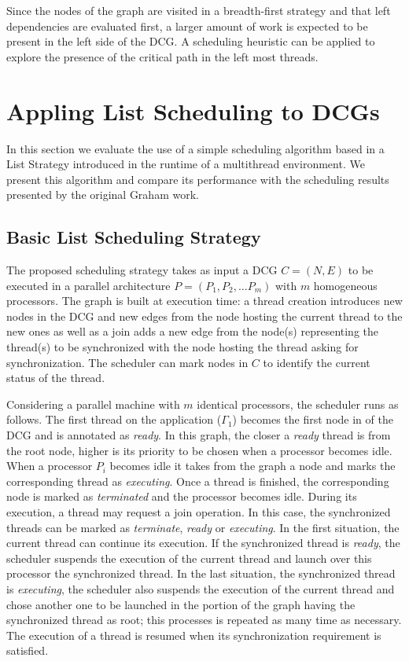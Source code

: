 \documentclass[twocolumn]{svjour3}
\begin{document}
Since the nodes of the graph are visited in a breadth-first strategy and that left {\color{blue}dependencies} are evaluated first, a larger amount of work is expected to be present in the left side of the DCG. A scheduling heuristic can be applied to explore the presence of the {\color{blue}critical path} in the left most threads.

\section{Appling List Scheduling to DCGs}\label{sec:evaluation}

In this section we evaluate the use of a simple scheduling algorithm based in a List Strategy introduced in the runtime of a multithread environment. We present this algorithm and compare its performance with {\color{blue}the scheduling results} presented by the original Graham {\color{blue}work}. 

\subsection{Basic List Scheduling Strategy}\label{sec:schedalgo}

The proposed scheduling strategy takes as input a DCG $C = (N,E)$ to be executed in a parallel architecture $P = (P_1, P_2, \dots P_m)$ with $m$ homogeneous processors. The graph is built at execution time: a thread creation introduces new nodes in the DCG and new edges from the node hosting the current thread to the new ones as well as a join adds a new edge from the node(s) representing the thread(s) to be synchronized with the node hosting the thread asking for synchronization. The scheduler can mark nodes in $C$ to identify the current status of the thread.

Considering a parallel machine with $m$ identical processors, {\color{blue}the scheduler runs as follows}. The first thread on the application ($\Gamma_1$) becomes the first node in of the DCG and is annotated as {\em ready}. In this graph, {\color{blue}the closer} a {\em ready} thread is from the root node, higher is its priority to be chosen when a processor becomes idle. When a processor $P_i$ becomes idle it takes from the graph a node and marks the corresponding thread as {\em executing}. Once a thread is finished, the corresponding node is marked as {\em terminated} and the processor becomes idle. During its execution, a thread may request {\color{blue}a join} operation. In this case, the synchronized threads can be marked as {\em terminate}, {\em ready} or {\em executing}. In the first situation, the current thread can continue its execution. If the synchronized thread is {\em ready}, the scheduler suspends the execution of the current thread and launch over this processor the synchronized thread. In the last situation, the synchronized thread is {\em executing}, the scheduler also suspends the execution of the current thread and chose another one to be launched in the portion of the graph having the synchronized thread as root; this processes is repeated as many time as necessary. The execution of a thread is resumed when its synchronization requirement is satisfied.
\end{document}

